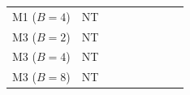 \begin{table}[!t]
\begin{tabular}{@{}llccccccc@{}}
M1 ($B{=}4$) & NT & \RNumMOneNRRecentNewTopic{} & \RNumMOneRRRecentNewTopic{} & \RNumMOneDCRecentNewTopic{} & \RNumMOneRNRecentNewTopic{} & \RNumMOneQLRecentNewTopic{} & \RNumMOneSSRecentNewTopic{} & \RNumMOneAFRecentNewTopic{} \\
M3 ($B{=}2$) & NT & \RNumMThreeNRRecentNewTopic{} & \RNumMThreeRRRecentBTwoNewTopic{} & \RNumMThreeDCRecentBTwoNewTopic{} & \RNumMThreeRNRecentBTwoNewTopic{} & \RNumMThreeQLRecentBTwoNewTopic{} & \RNumMThreeSSRecentBTwoNewTopic{} & \RNumMThreeAFRecentNewTopic{} \\
M3 ($B{=}4$) & NT & \RNumMThreeNRRecentNewTopic{} & \RNumMThreeRRRecentBFourNewTopic{} & \RNumMThreeDCRecentBFourNewTopic{} & \RNumMThreeRNRecentBFourNewTopic{} & \RNumMThreeQLRecentBFourNewTopic{} & \RNumMThreeSSRecentBFourNewTopic{} & \RNumMThreeAFRecentNewTopic{} \\
M3 ($B{=}8$) & NT & \RNumMThreeNRRecentNewTopic{} & \RNumMThreeRRRecentBEightNewTopic{} & \RNumMThreeDCRecentBEightNewTopic{} & \RNumMThreeRNRecentBEightNewTopic{} & \RNumMThreeQLRecentBEightNewTopic{} & \RNumMThreeSSRecentBEightNewTopic{} & \RNumMThreeAFRecentNewTopic{} \\
\bottomrule
\end{tabular}
\end{table}

